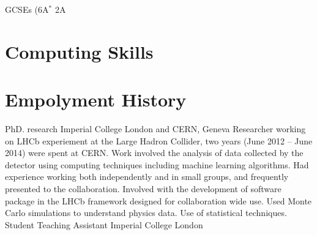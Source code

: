 {GCSEs (6A$^*$ 2A

\section{Computing Skills}


\section{Empolyment History}
{PhD. research}
{Imperial College London and CERN, Geneva}
{}{}
{
  Researcher working on LHCb experiement at the Large Hadron Collider, two years (June 2012 -- June
  2014) were spent at CERN.
  Work involved the analysis of data collected by the detector using computing techniques including
  machine learning algorithms.
  Had experience working both independently and in small groups, and frequently presented to the
  collaboration.
  Involved with the development of software package in the LHCb framework designed for
  collaboration wide use.
  Used Monte Carlo simulations to understand physics data.
  Use of statistical techniques.
}
{Student Teaching Assistant}
{Imperial College London}
{}{}
{
  \begin{itemize}

\end{itemize}}}
